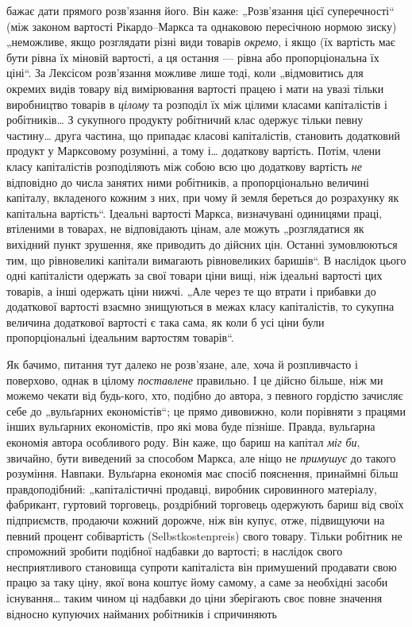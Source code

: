 \parcont{}  %
бажає дати прямого розв’язання його. Він каже: „Розв’язання
цієї суперечності“ (між законом вартості Рікардо--Маркса та однаковою
пересічною нормою зиску) „неможливе, якщо розглядати
різні види товарів \emph{окремо}, і якщо (їх вартість має бути
рівна їх міновій вартості, а ця остання — рівна або пропорціональна
їх ціні“. За Лексісом розв’язання можливе лише тоді,
коли „відмовитись для окремих видів товару від вимірювання
вартості працею і мати на увазі тільки виробництво товарів
в \emph{цілому} та розподіл їх між цілими класами капіталістів і робітників\dots{}
З сукупного продукту робітничий клас одержує тільки
певну частину\dots{} друга частина, що припадає класові капіталістів,
становить додатковий продукт у Марксовому розумінні, а тому і\dots{}
додаткову вартість. Потім, члени класу капіталістів розподіляють
між собою всю цю додаткову вартість \emph{не} відповідно до числа
занятих ними робітників, а пропорціонально величині капіталу,
вкладеного кожним з них, при чому й земля береться до розрахунку
як капітальна вартість“. Ідеальні вартості Маркса, визначувані
одиницями праці, втіленими в товарах, не відповідають
цінам, але можуть „розглядатися як вихідний пункт зрушення,
яке приводить до дійсних цін. Останні зумовлюються тим, що
рівновеликі капітали вимагають рівновеликих баришів“. В наслідок
цього одні капіталісти одержать за свої товари ціни вищі,
ніж ідеальні вартості цих товарів, а інші одержать ціни нижчі.
„Але через те що втрати і прибавки до додаткової вартості
взаємно знищуються в межах класу капіталістів, то сукупна
величина додаткової вартості є така сама, як коли б усі ціни
були пропорціональні ідеальним вартостям товарів“.

Як бачимо, питання тут далеко не розв’язане, але, хоча й
розпливчасто і поверхово, однак в цілому \emph{поставлене} правильно.
І це дійсно більше, ніж ми можемо чекати від будь-кого,
хто, подібно до автора, з певного гордістю зачисляє себе
до „вульґарних економістів“; це прямо дивовижно, коли порівняти
з працями інших вульґарних економістів, про які мова буде
пізніше. Правда, вульґарна економія автора особливого роду.
Він каже, що бариш на капітал \emph{міг би}, звичайно, бути виведений
за способом Маркса, але ніщо не \emph{примушує} до такого розуміння.
Навпаки. Вульґарна економія має спосіб пояснення, принаймні
більш правдоподібний: „капіталістичні продавці, виробник
сировинного матеріалу, фабрикант, гуртовий торговець,
роздрібний торговець одержують бариш від своїх підприємств,
продаючи кожний дорожче, ніж він купує, отже, підвищуючи
на певний процент собівартість (Selbstkostenpreis) свого товару.
Тільки робітник не спроможний зробити подібної надбавки до
вартості; в наслідок свого несприятливого становища супроти
капіталіста він примушений продавати свою працю за таку ціну,
якої вона коштує йому самому, а саме за необхідні засоби існування\dots{}
таким чином ці надбавки до ціни зберігають своє повне
значення відносно купуючих найманих робітників і спричиняють
\parbreak{}  %
